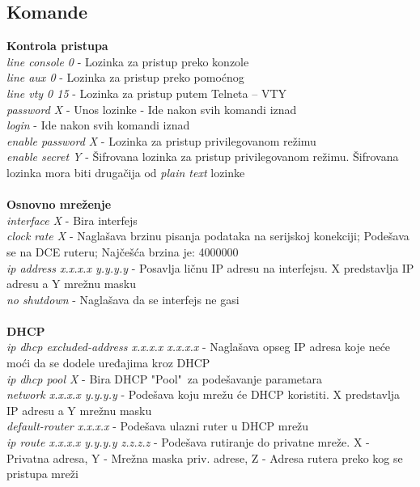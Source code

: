 \subsection{Komande}

\textbf{Kontrola pristupa}\\
\textit{line console 0} - Lozinka za pristup preko konzole\\
\textit{line aux 0} - Lozinka za pristup preko pomo\'{c}nog\\
\textit{line vty 0 15} - Lozinka za pristup putem Telneta – VTY\\
\textit{password X} - Unos lozinke - Ide nakon svih komandi iznad\\
\textit{login} - Ide nakon svih komandi iznad\\
\textit{enable password X} - Lozinka za pristup privilegovanom režimu\\
\textit{enable secret Y} - Šifrovana lozinka za pristup privilegovanom režimu. Šifrovana lozinka mora biti drugačija od \textit{plain text} lozinke\\\\

\textbf{Osnovno mreženje}\\
\textit{interface X} - Bira interfejs\\
\textit{clock rate X} - Naglašava brzinu pisanja podataka na serijskoj konekciji; Podešava se na DCE ruteru; Najčeš\'{c}a brzina je: 4000000\\
\textit{ip address x.x.x.x y.y.y.y} - Posavlja ličnu IP adresu na interfejsu. X predstavlja IP adresu a Y mrežnu masku\\
\textit{no shutdown} - Naglašava da se interfejs ne gasi\\\\

\textbf{DHCP}\\
\textit{ip dhcp excluded-address x.x.x.x x.x.x.x} - Naglašava opseg IP adresa koje ne\'{c}e mo\'{c}i da se dodele uređajima kroz DHCP\\
\textit{ip dhcp pool X} - Bira DHCP "Pool"\ za podešavanje parametara\\
\textit{network x.x.x.x y.y.y.y} - Podešava koju mrežu \'{c}e DHCP koristiti. X predstavlja IP adresu a Y mrežnu masku\\
\textit{default-router x.x.x.x} - Podešava ulazni ruter u DHCP mrežu\\
\textit{ip route x.x.x.x y.y.y.y z.z.z.z} - Podešava rutiranje do privatne mreže. X - Privatna adresa, Y - Mrežna maska priv. adrese, Z - Adresa rutera preko kog se pristupa mreži\\\\

